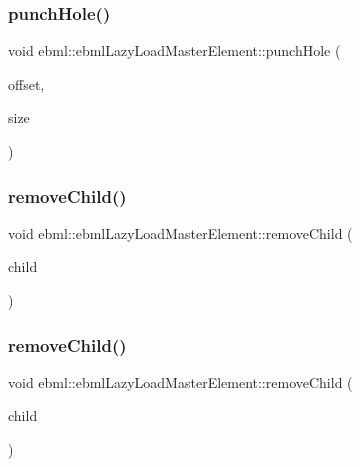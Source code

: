 \subsubsection{\texorpdfstring{punch\+Hole()}{punchHole()}}
{\footnotesize\ttfamily void ebml\+::ebml\+Lazy\+Load\+Master\+Element\+::punch\+Hole (\begin{DoxyParamCaption}\item[{unsigned long long}]{offset,  }\item[{size\+\_\+t}]{size }\end{DoxyParamCaption})}

\mbox{\label{classebml_1_1ebmlLazyLoadMasterElement_a6adedb56aa90f72de79fd9fbb0c4453e}} 
\subsubsection{\texorpdfstring{remove\+Child()}{removeChild()}\hspace{0.1cm}{\footnotesize\ttfamily [1/3]}}
{\footnotesize\ttfamily void ebml\+::ebml\+Lazy\+Load\+Master\+Element\+::remove\+Child (\begin{DoxyParamCaption}\item[{const std\+::shared\+\_\+ptr$<$ \mbox{\hyperlink{classebml_1_1ebmlElement}{ebml\+Element}} $>$ \&}]{child }\end{DoxyParamCaption})}

\mbox{\label{classebml_1_1ebmlLazyLoadMasterElement_ab9ceadb087d706222b2167f4c29dfe0e}} 
\subsubsection{\texorpdfstring{remove\+Child()}{removeChild()}\hspace{0.1cm}{\footnotesize\ttfamily [2/3]}}
{\footnotesize\ttfamily void ebml\+::ebml\+Lazy\+Load\+Master\+Element\+::remove\+Child (\begin{DoxyParamCaption}\item[{\mbox{\hyperlink{classebml_1_1ebmlElement}{ebml\+Element}} $\ast$}]{child }\end{DoxyParamCaption})}

